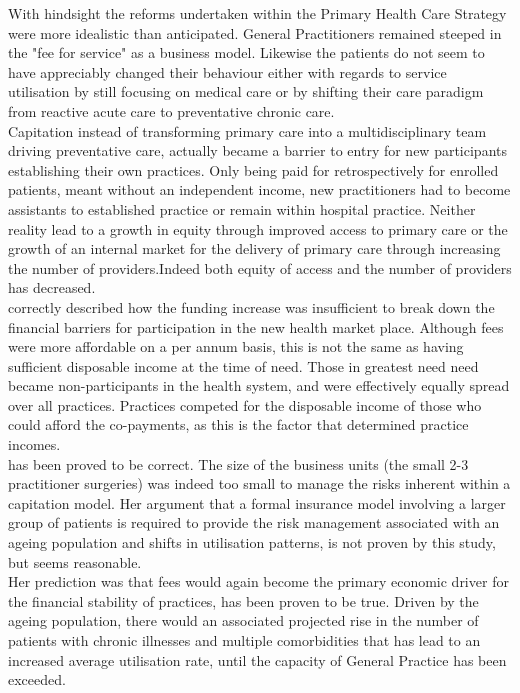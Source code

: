 \documentclass[11pt,a4paper]{article}
\begin{document}
With hindsight the reforms undertaken within the Primary Health Care Strategy were more idealistic than anticipated. General Practitioners remained steeped in the "fee for service" as a business model. Likewise the patients do not seem to have appreciably changed their behaviour either with regards to service utilisation by still focusing on medical care or by shifting their care paradigm from reactive acute care to preventative chronic care. \\

Capitation instead of transforming primary care into a multidisciplinary team driving preventative care, actually became a barrier to entry for new participants establishing their own practices. Only being paid for retrospectively for enrolled patients, meant without an independent income, new practitioners had to become assistants to established practice or remain within hospital practice. Neither reality lead to a growth in equity through improved access to primary care or the growth of an internal market for the delivery of primary care through increasing the number of providers.Indeed both equity of access and the number of providers has decreased.\\

\citet{cumming2008reforming} correctly described how the funding increase was insufficient to break down the financial barriers for participation in the new health market place. Although fees were more affordable on a per annum basis, this is not the same as having sufficient disposable income at the time of need. Those in greatest need need became non-participants in the health system, and were effectively equally spread over all practices. Practices competed for the disposable income of those who could afford the co-payments, as this is the factor that determined practice incomes.\\

\citet{howell2005restructuring} has been proved to be correct. The size of the business units (the small 2-3 practitioner surgeries) was indeed too small to manage the risks inherent within a capitation model\citep{howell2005restructuring}. Her argument that a formal insurance model involving a larger group of patients is required to provide the risk management associated with an ageing population and shifts in utilisation patterns, is not proven by this study, but seems reasonable. \\

Her prediction was that fees would again become the primary economic driver for the financial stability of practices, has been proven to be true\citep{howell2005restructuring}. Driven by the ageing  population, there would an associated projected rise in the number of patients with chronic illnesses and multiple comorbidities that has lead to an increased  average utilisation rate, until the capacity of General Practice has been exceeded. \\
\end{document}
